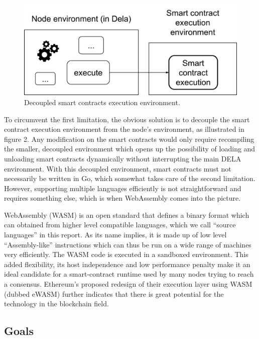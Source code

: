 \documentclass[11pt, a4paper, twoside, openright]{article}
\begin{document}
\begin{figure}[htbp]
 \centering
  \includegraphics[width=12cm]{wasm2.png}
  \caption{Decoupled smart contracts execution environment.}
\end{figure}

To circumvent the first limitation, the obvious solution is to decouple the smart contract execution environment from the node's environment, as illustrated in figure 2. Any modification on the smart contracts would only require recompiling the smaller, decoupled environment which opens up the possibility of loading and unloading smart contracts dynamically without interrupting the main DELA environment. With this decoupled environment, smart contracts must not necessarily be written in Go, which somewhat takes care of the second limitation. However, supporting multiple languages efficiently is not straightforward and requires something else, which is when WebAssembly comes into the picture.

WebAssembly (WASM) is an open standard that defines a binary format which can obtained from higher level compatible languages, which we call ``source languages'' in this report. As its name implies, it is made up of low level ``Assembly-like'' instructions which can thus be run on a wide range of machines very efficiently. The WASM code is executed in a sandboxed environment. This added flexibility, its host independence and low performance penalty make it an ideal candidate for a smart-contract runtime used by many nodes trying to reach a consensus. Ethereum's proposed redesign of their execution layer using WASM (dubbed eWASM) \cite{ewasm} further indicates that there is great potential for the technology in the blockchain field. 

\subsection{Goals}
\label{Goals}
\end{document}
